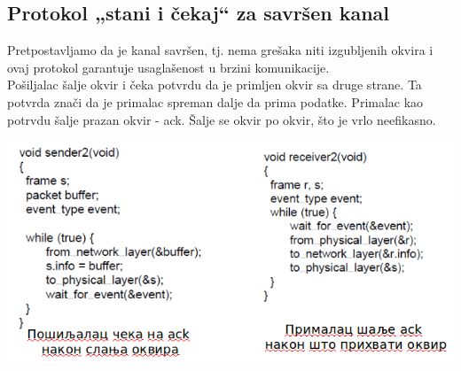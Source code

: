 \documentclass{article} %
\begin{document}
\subsection{Protokol „stani i čekaj“ za savršen kanal}
Pretpostavljamo da je kanal savršen, tj. nema grešaka niti izgubljenih okvira i ovaj protokol garantuje usaglašenost u brzini komunikacije. \\
Pošiljalac šalje okvir i čeka potvrdu da je primljen okvir sa druge strane. Ta potvrda znači da je primalac spreman dalje da prima podatke. Primalac kao potrvdu šalje prazan okvir - ack. Šalje se okvir po okvir, što je vrlo neefikasno.
\begin{center}
	\includegraphics[scale=0.5]{staniIcekaj1}
\end{center}
\end{document}
